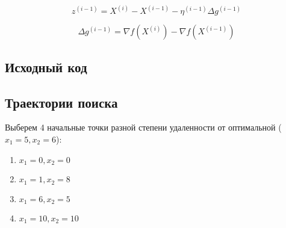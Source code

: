 \begin{equation*}
z^{(i-1)} = X^{(i)} - X^{(i-1)} - \eta^{(i-1)} \Delta g^{(i-1)}
\end{equation*}

\begin{equation*}
\Delta g^{(i-1)} = \nabla f\left(X^{(i)}\right) - \nabla f\left(X^{(i-1)}\right)
\end{equation*}

\subsection{Исходный код}



\subsection{Траектории поиска}

Выберем 4 начальные точки разной степени удаленности от оптимальной ($x_1 = 5, x_2 = 6$): 
\begin{multicols}{2} 
\begin{enumerate}
	\setlength{\itemsep}{0em}
	\item $x_1 = 0, x_2 = 0$
	\item $x_1 = 1, x_2 = 8$
	\item $x_1 = 6, x_2 = 5$
	\item $x_1 = 10, x_2 = 10$
\end{enumerate}
\end{multicols}

